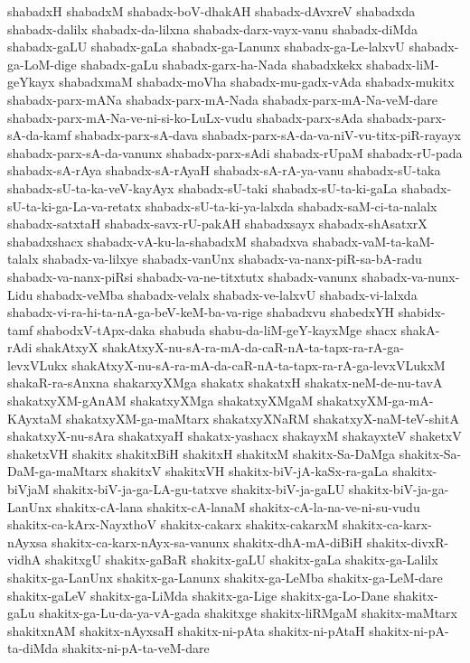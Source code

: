 {shabadxH
shabadxM
shabadx-boV-dhakAH
shabadx-dAvxreV
shabadxda
shabadx-dalilx
shabadx-da-lilxna
shabadx-darx-vayx-vanu
shabadx-diMda
shabadx-gaLU
shabadx-gaLa
shabadx-ga-Lanunx
shabadx-ga-Le-lalxvU
shabadx-ga-LoM-dige
shabadx-gaLu
shabadx-garx-ha-Nada
shabadxkekx
shabadx-liM-geYkayx
shabadxmaM
shabadx-moVha
shabadx-mu-gadx-vAda
shabadx-mukitx
shabadx-parx-mANa
shabadx-parx-mA-Nada
shabadx-parx-mA-Na-veM-dare
shabadx-parx-mA-Na-ve-ni-si-ko-LuLx-vudu
shabadx-parx-sAda
shabadx-parx-sA-da-kamf
shabadx-parx-sA-dava
shabadx-parx-sA-da-va-niV-vu-titx-piR-rayayx
shabadx-parx-sA-da-vanunx
shabadx-parx-sAdi
shabadx-rUpaM
shabadx-rU-pada
shabadx-sA-rAya
shabadx-sA-rAyaH
shabadx-sA-rA-ya-vanu
shabadx-sU-taka
shabadx-sU-ta-ka-veV-kayAyx
shabadx-sU-taki
shabadx-sU-ta-ki-gaLa
shabadx-sU-ta-ki-ga-La-va-retatx
shabadx-sU-ta-ki-ya-lalxda
shabadx-saM-ci-ta-nalalx
shabadx-satxtaH
shabadx-savx-rU-pakAH
shabadxsayx
shabadx-shAsatxrX
shabadxshacx
shabadx-vA-ku-la-shabadxM
shabadxva
shabadx-vaM-ta-kaM-talalx
shabadx-va-lilxye
shabadx-vanUnx
shabadx-va-nanx-piR-sa-bA-radu
shabadx-va-nanx-piRsi
shabadx-va-ne-titxtutx
shabadx-vanunx
shabadx-va-nunx-Lidu
shabadx-veMba
shabadx-velalx
shabadx-ve-lalxvU
shabadx-vi-lalxda
shabadx-vi-ra-hi-ta-nA-ga-beV-keM-ba-va-rige
shabadxvu
shabedxYH
shabidx-tamf
shabodxV-tApx-daka
shabuda
shabu-da-liM-geY-kayxMge
shacx
shakA-rAdi
shakAtxyX
shakAtxyX-nu-sA-ra-mA-da-caR-nA-ta-tapx-ra-rA-ga-levxVLukx
shakAtxyX-nu-sA-ra-mA-da-caR-nA-ta-tapx-ra-rA-ga-levxVLukxM
shakaR-ra-sAnxna
shakarxyXMga
shakatx
shakatxH
shakatx-neM-de-nu-tavA
shakatxyXM-gAnAM
shakatxyXMga
shakatxyXMgaM
shakatxyXM-ga-mA-KAyxtaM
shakatxyXM-ga-maMtarx
shakatxyXNaRM
shakatxyX-naM-teV-shitA
shakatxyX-nu-sAra
shakatxyaH
shakatx-yashacx
shakayxM
shakayxteV
shaketxV
shaketxVH
shakitx
shakitxBiH
shakitxH
shakitxM
shakitx-Sa-DaMga
shakitx-Sa-DaM-ga-maMtarx
shakitxV
shakitxVH
shakitx-biV-jA-kaSx-ra-gaLa
shakitx-biVjaM
shakitx-biV-ja-ga-LA-gu-tatxve
shakitx-biV-ja-gaLU
shakitx-biV-ja-ga-LanUnx
shakitx-cA-lana
shakitx-cA-lanaM
shakitx-cA-la-na-ve-ni-su-vudu
shakitx-ca-kArx-NayxthoV
shakitx-cakarx
shakitx-cakarxM
shakitx-ca-karx-nAyxsa
shakitx-ca-karx-nAyx-sa-vanunx
shakitx-dhA-mA-diBiH
shakitx-divxR-vidhA
shakitxgU
shakitx-gaBaR
shakitx-gaLU
shakitx-gaLa
shakitx-ga-Lalilx
shakitx-ga-LanUnx
shakitx-ga-Lanunx
shakitx-ga-LeMba
shakitx-ga-LeM-dare
shakitx-gaLeV
shakitx-ga-LiMda
shakitx-ga-Lige
shakitx-ga-Lo-Dane
shakitx-gaLu
shakitx-ga-Lu-da-ya-vA-gada
shakitxge
shakitx-liRMgaM
shakitx-maMtarx
shakitxnAM
shakitx-nAyxsaH
shakitx-ni-pAta
shakitx-ni-pAtaH
shakitx-ni-pA-ta-diMda
shakitx-ni-pA-ta-veM-dare
}

